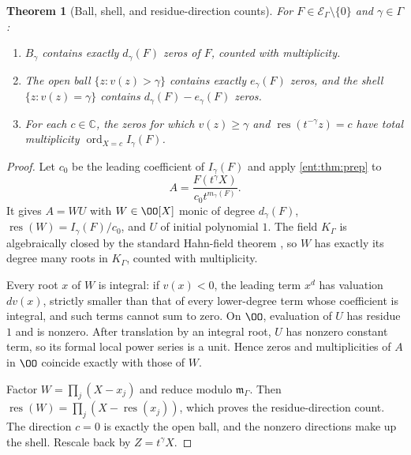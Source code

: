 \documentclass[11pt]{article}
\newtheorem{theorem}{Theorem}[section]
\theoremstyle{plain}
\theoremstyle{plain}
\theoremstyle{plain}
\theoremstyle{definition}
\theoremstyle{definition}
\theoremstyle{definition}
\theoremstyle{definition}
\theoremstyle{remark}
\newcommand{\C}{\mathbb C}\newcommand{\R}{\mathbb R}
\newcommand{\K}{K_\Gamma}\newcommand{\KD}{K_\Delta}
\newcommand{\E}{\mathcal E_\Gamma}
\newcommand{\mm}{\mathfrak m_\Gamma}
\DeclareMathOperator{\ord}{ord}\DeclareMathOperator{\cf}{cf}
\newcommand{\res}{\operatorname{res}}
\begin{document}
\begin{theorem}[Ball, shell, and residue-direction counts]
\label{ent:thm:roots}
For $F\in\E\setminus\{0\}$ and $\gamma\in\Gamma$:
\begin{enumerate}[label=\textnormal{(\alph*)},leftmargin=2em]
\item $B_\gamma$ contains exactly $d_\gamma(F)$ zeros of $F$, counted with
multiplicity.
\item The open ball $\{z:v(z)>\gamma\}$ contains exactly $e_\gamma(F)$ zeros,
and the shell $\{z:v(z)=\gamma\}$ contains $d_\gamma(F)-e_\gamma(F)$ zeros.
\item For each $c\in\C$, the zeros for which $v(z)\ge\gamma$ and
$\res(t^{-\gamma}z)=c$ have total multiplicity $\ord_{X=c}I_\gamma(F)$.
\end{enumerate}
\end{theorem}
\begin{proof}
Let $c_0$ be the leading coefficient of $I_\gamma(F)$ and apply
\cref{ent:thm:prep} to
\[
 A=\frac{F(t^\gamma X)}{c_0t^{m_\gamma(F)}}.
\]
It gives $A=WU$ with $W\in\OO[X]$ monic of degree $d_\gamma(F)$,
$\res(W)=I_\gamma(F)/c_0$, and $U$ of initial polynomial $1$. The field $\K$
is algebraically closed by the standard Hahn-field theorem
\cite[Corollary~4]{Poonen}, so $W$ has exactly its degree many roots in $\K$,
counted with multiplicity.

Every root $x$ of $W$ is integral: if $v(x)<0$, the leading term $x^d$ has
valuation $dv(x)$, strictly smaller than that of every lower-degree term
whose coefficient is integral, and such terms cannot sum to zero. On $\OO$,
evaluation of $U$ has residue $1$ and is nonzero. After translation by an
integral root, $U$ has nonzero constant term, so its formal local power
series is a unit. Hence zeros and multiplicities of $A$ in $\OO$ coincide
exactly with those of $W$.

Factor $W=\prod_j(X-x_j)$ and reduce modulo $\mm$. Then
$\res(W)=\prod_j(X-\res(x_j))$, which proves the residue-direction count.
The direction $c=0$ is exactly the open ball, and the nonzero directions make
up the shell. Rescale back by $Z=t^\gamma X$.
\end{proof}
\end{document}
